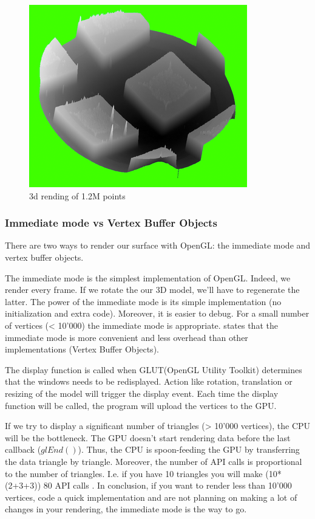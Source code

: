 \begin{figure}[H]
  \centering
  \includegraphics[scale=0.8]{images/3drendering.png}
    \caption{3d rending of 1.2M points}
  \label{rendering3d}
\end{figure}

\subsubsection{Immediate mode vs Vertex Buffer Objects}

There are two ways to render our surface with OpenGL: the immediate mode and vertex buffer objects.

The immediate mode is the simplest implementation of OpenGL. Indeed, we render every frame. If we rotate the our 3D model, we'll have to regenerate the latter. The power of the immediate mode is its simple implementation (no initialization and extra code). Moreover, it is easier to debug. For a small number of vertices (< 10'000) the immediate mode is appropriate. \cite{opengl1} states that the immediate mode is more convenient and less overhead than other implementations (Vertex Buffer Objects).

The display function is called when GLUT(OpenGL Utility Toolkit) determines that the windows needs to be redisplayed. Action like rotation, translation or resizing of the model will trigger the display event. Each time the display function will be called, the program will upload the vertices to the GPU.

If we try to display a significant number of triangles (> 10'000 vertices), the CPU will be the bottleneck. The GPU doesn't start rendering data before the last callback ($glEnd()$). Thus, the CPU is spoon-feeding the GPU by transferring the data triangle by triangle. Moreover, the number of API calls is proportional to the number of triangles. I.e. if you have 10 triangles you will make (10*(2+3+3)) 80 API calls \cite{opengllegacy}. In conclusion, if you want to render less than 10'000 vertices, code a quick implementation and are not planning on making a lot of changes in your rendering, the immediate mode is the way to go.

